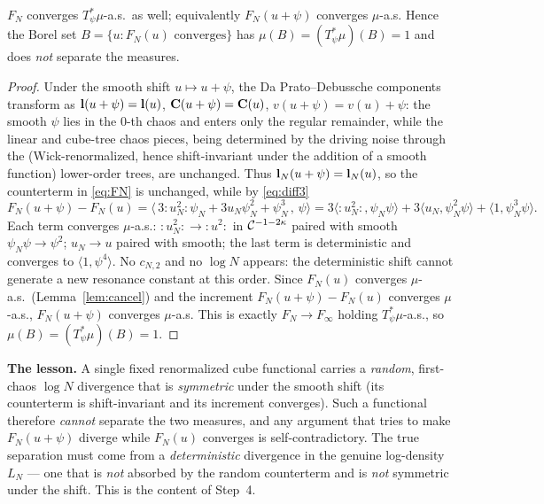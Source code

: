 \begin{qonelemma}\label{lem:nosep}
$F_N$ converges $T_\psi^*\mu$-a.s.\ as well; equivalently $F_N(u+\psi)$ converges
$\mu$-a.s. Hence the Borel set $B=\{u:F_N(u)\text{ converges}\}$ has
$\mu(B)=(T_\psi^*\mu)(B)=1$ and does \emph{not} separate the measures.
\end{qonelemma}
\begin{proof}
Under the smooth shift $u\mapsto u+\psi$, the Da Prato--Debussche components transform
as $\mathbf{l}(u+\psi)=\mathbf{l}(u)$, $\mathbf{C}(u+\psi)=\mathbf{C}(u)$,
$v(u+\psi)=v(u)+\psi$: the smooth $\psi$ lies in the $0$-th chaos and enters only the
regular remainder, while the linear and cube-tree chaos pieces, being determined by the
driving noise through the (Wick-renormalized, hence shift-invariant under the addition
of a smooth function) lower-order trees, are unchanged. Thus
$\mathbf{l}_N(u+\psi)=\mathbf{l}_N(u)$, so the counterterm in \eqref{eq:FN} is unchanged,
while by \eqref{eq:diff3}
\[
F_N(u+\psi)-F_N(u)=\bigl\langle\,3{:}u_N^2{:}\psi_N+3u_N\psi_N^2+\psi_N^3\,,\,\psi\bigr\rangle
=3\langle{:}u_N^2{:},\psi_N\psi\rangle+3\langle u_N,\psi_N^2\psi\rangle+\langle1,\psi_N^3\psi\rangle .
\]
Each term converges $\mu$-a.s.: ${:}u_N^2{:}\to{:}u^2{:}$ in $\mathcal{C}^{-1-2\kappa}$
paired with smooth $\psi_N\psi\to\psi^2$; $u_N\to u$ paired with smooth; the last term
is deterministic and converges to $\langle1,\psi^4\rangle$. No $c_{N,2}$ and no $\log N$
appears: the deterministic shift cannot generate a new resonance constant at this
order. Since $F_N(u)$ converges $\mu$-a.s.\ (Lemma~\ref{lem:cancel}) and the increment
$F_N(u+\psi)-F_N(u)$ converges $\mu$-a.s., $F_N(u+\psi)$ converges $\mu$-a.s. This is
exactly $F_N\to F_\infty$ holding $T_\psi^*\mu$-a.s., so $\mu(B)=(T_\psi^*\mu)(B)=1$.
\end{proof}

\noindent\textbf{The lesson.} A single fixed renormalized cube functional carries a
\emph{random}, first-chaos $\log N$ divergence that is \emph{symmetric} under the smooth
shift (its counterterm is shift-invariant and its increment converges). Such a
functional therefore \emph{cannot} separate the two measures, and any argument that
tries to make $F_N(u+\psi)$ diverge while $F_N(u)$ converges is self-contradictory. The
true separation must come from a \emph{deterministic} divergence in the genuine
log-density $L_N$ --- one that is \emph{not} absorbed by the random counterterm and is
\emph{not} symmetric under the shift. This is the content of Step~4.

